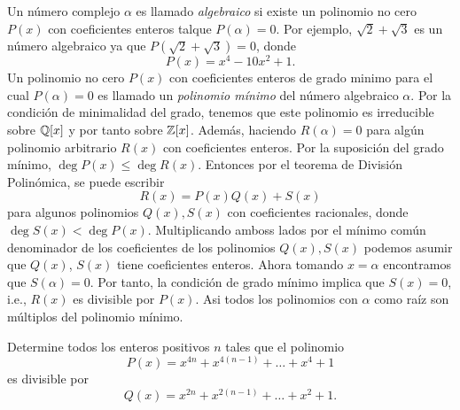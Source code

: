 Un número complejo $\alpha$ es llamado \textit{algebraico}  si existe un polinomio no cero $P(x)$ con coeficientes enteros talque $P(\alpha) = 0$.
Por ejemplo, $\sqrt {2} + \sqrt {3}$ es un número algebraico ya que $P\left(\sqrt {2} + \sqrt {3}\right) = 0$, donde
\[
    P(x) = x^4 - 10x^2 + 1.
\]
Un polinomio no cero $P(x)$ con coeficientes enteros de grado minimo para el cual $P(\alpha) = 0$ es llamado un \textit{polinomio mínimo}  del número algebraico $\alpha$.
Por la condición de minimalidad del grado, tenemos que este polinomio es irreducible sobre $\mathbb{Q}[x]$ y por tanto sobre $\mathbb{Z}[x]$.
Además, haciendo $R(\alpha) = 0$ para algún polinomio arbitrario $R(x)$ con coeficientes enteros.
Por la suposición del grado mínimo, $\deg{P(x)} \leq \deg{R(x)}$.
Entonces por el teorema de División Polinómica, se puede escribir
\[
    R(x) = P(x) Q(x) + S(x)
\]
para algunos polinomios $Q(x), S(x)$ con coeficientes racionales, donde $\deg{S(x)} < \deg{P(x)}$.
Multiplicando amboss lados por el mínimo común denominador de los coeficientes de los polinomios $Q(x), S(x)$ podemos asumir que $Q(x)$, $S(x)$ tiene coeficientes enteros.
Ahora tomando $x = \alpha$ encontramos que $S(\alpha) = 0$.
Por tanto, la condición de grado mínimo implica que $S(x) = 0$, i.e., $R(x)$ es divisible por $P(x)$.
Asi todos los polinomios con $\alpha$ como raíz son múltiplos del polinomio mínimo.

\begin{example}
    Determine todos los enteros positivos $n$ tales que el polinomio
    \[
        P(x) = x^{4n} + x^{4(n - 1)} + \ldots + x^4 + 1
    \]
    es divisible por
    \[
        Q(x) = x^{2n} + x^{2(n - 1)} + \ldots + x^2 + 1.
    \]
\end{example}



